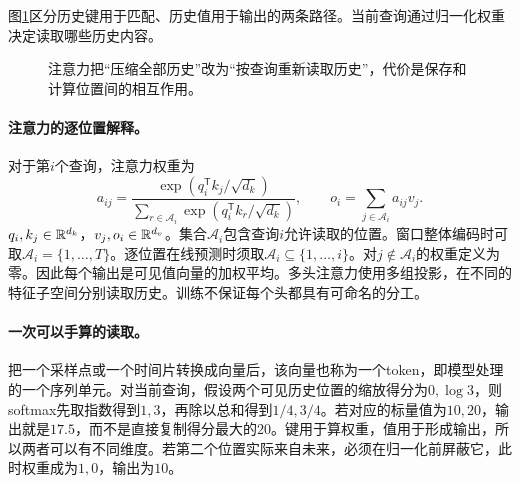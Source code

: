 图\ref{fig:sequence-attention-query}区分历史键用于匹配、历史值用于输出的两条路径。当前查询通过归一化权重决定读取哪些历史内容。
\begin{figure}[htbp]
\centering
{}
\caption{注意力把“压缩全部历史”改为“按查询重新读取历史”，代价是保存和计算位置间的相互作用。}
\label{fig:sequence-attention-query}
\end{figure}

\paragraph{注意力的逐位置解释。}
对于第$i$个查询，注意力权重为
\begin{equation}
 a_{ij}=\frac{\exp(q_i^{\mathsf T}k_j/\sqrt{d_k})}{\sum_{r\in\mathcal A_i}\exp(q_i^{\mathsf T}k_r/\sqrt{d_k})},
 \qquad o_i=\sum_{j\in\mathcal A_i} a_{ij}v_j.
\end{equation}
$q_i,k_j\in\mathbb{R}^{d_k}$，$v_j,o_i\in\mathbb{R}^{d_v}$。集合$\mathcal A_i$包含查询$i$允许读取的位置。窗口整体编码时可取$\mathcal A_i=\{1,\ldots,T\}$。逐位置在线预测时须取$\mathcal A_i\subseteq\{1,\ldots,i\}$。对$j\notin\mathcal A_i$的权重定义为零。因此每个输出是可见值向量的加权平均。多头注意力使用多组投影，在不同的特征子空间分别读取历史。训练不保证每个头都具有可命名的分工。

\paragraph{一次可以手算的读取。}
把一个采样点或一个时间片转换成向量后，该向量也称为一个token，即模型处理的一个序列单元。对当前查询，假设两个可见历史位置的缩放得分为$0,\log3$，则softmax先取指数得到$1,3$，再除以总和得到$1/4,3/4$。若对应的标量值为$10,20$，输出就是$17.5$，而不是直接复制得分最大的$20$。键用于算权重，值用于形成输出，所以两者可以有不同维度。若第二个位置实际来自未来，必须在归一化前屏蔽它，此时权重成为$1,0$，输出为$10$。

